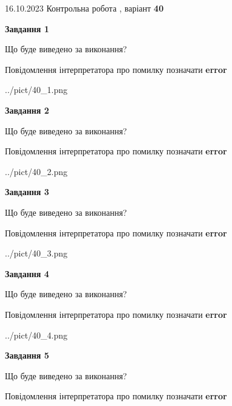 \documentclass[12pt, ukrainian]{article}
\begin{document}
{\Large{16.10.2023 Контрольна робота , варіант  \No \textbf { 40 }\par}}
{
\begin {large}
{\begin {center}\textbf{Завдання 1}\end {center}}\par
Що буде виведено за виконання? \par
Повідомлення інтерпретатора про помилку позначати \textbf{error}

\begin{center}
	{../pict/40_1.png}
\end{center}
\newpage

{\begin {center}\textbf{Завдання 2}\end {center}}\par
Що буде виведено за виконання? \par
Повідомлення інтерпретатора про помилку позначати \textbf{error}

\begin{center}
	{../pict/40_2.png}
\end{center}
\newpage

{\begin {center}\textbf{Завдання 3}\end {center}}\par
Що буде виведено за виконання? \par
Повідомлення інтерпретатора про помилку позначати \textbf{error}

\begin{center}
	{../pict/40_3.png}
\end{center}
\newpage

{\begin {center}\textbf{Завдання 4}\end {center}}\par
Що буде виведено за виконання? \par
Повідомлення інтерпретатора про помилку позначати \textbf{error}

\begin{center}
	{../pict/40_4.png}
\end{center}
\newpage

{\begin {center}\textbf{Завдання 5}\end {center}}\par
Що буде виведено за виконання? \par
Повідомлення інтерпретатора про помилку позначати \textbf{error}


\end{large}}
\end{document}
